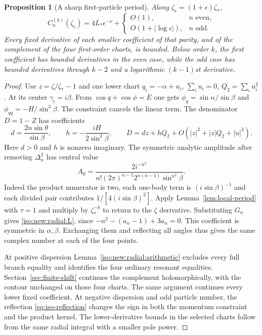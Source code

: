 \documentclass[11pt]{article}
\numberwithin{equation}{section}
\newtheorem{proposition}[theorem]{Proposition}
\theoremstyle{definition}
\begin{document}
\begin{proposition}[A sharp first-particle period]\label{iso:new:radial:first}
Along $\zeta_\epsilon=(1+\epsilon)\zeta_*$,
\[
 C_n^{(k)}(\zeta_\epsilon)=4L_*\epsilon^{-\nu}
       +\begin{cases}O(1),&n\text{ even},\\
                  O(1+|\log\epsilon|),&n\text{ odd}.
         \end{cases}
\]
Every fixed derivative of each smaller coefficient of that
parity, and of the complement of the four first-order
charts, is bounded.  Below order $k$, the first coefficient
has bounded derivatives in the even case, while the odd case
has bounded derivatives through $k-2$ and a logarithmic
$(k-1)$st derivative.
\end{proposition}
\begin{proof}
Use $z=\zeta/\zeta_*-1$ and one lower chart
$q_i=-\alpha+u_i$, $\sum_i u_i=0$, $Q_2=\sum_i u_i^2$.
At its center $\gamma_i=i\beta$. From $\cos q+\cos\phi=E$ one gets
$\phi_q=\sin\alpha/\sin\beta$ and
$\phi_{qq}=-H/\sin^3\beta$. The constraint cancels the linear term.
The denominator $D=1-Z$ has coefficients
\[
 d=\frac{2n\sin\theta}{\sin\beta},\qquad
 h=-\frac{iH}{2\sin^3\beta},\qquad D=d z+hQ_2+
            O(|z|^2+|z|Q_2+|u|^3).
\]
Here $d>0$ and $h$ is nonzero imaginary. The symmetric analytic
amplitude after removing $\Delta_n^2$ has central value
\[
 A_0=\frac{2i^{-n^2}}
 {n!(2\pi)^{n-1}2^{n(n-1)}\sin^{n^2}\beta}.
\]
Indeed the product numerator is two, each one-body term is
$(i\sin\beta)^{-1}$ and each divided pair contributes
$1/[4(i\sin\beta)^2]$. Apply Lemma~\ref{lem:local-period} with
$\tau=1$ and multiply by $\zeta_*^{-k}$ to return to the
$\zeta$ derivative. Substituting $G_n$ gives \eqref{iso:new:radial:L},
since $-n^2-(a_n-1)+3a_n=0$. This coefficient is symmetric in
$\alpha,\beta$. Exchanging them and reflecting all angles thus
gives the same complex number at each of the four points.

At positive dispersion Lemma~\ref{iso:new:radial:arithmetic}
excludes every full branch equality and identifies the four ordinary
resonant equalities. Section~\ref{sec:finite-shift} continues the
complement holomorphically, with the contour unchanged on those four
charts. The same argument continues every lower fixed coefficient.
At negative dispersion and odd particle number, the reflection
\eqref{eq:iso-reflection} changes the sign in both the momentum
constraint and the product kernel.
The lower-derivative bounds in the selected charts follow
from the same radial integral with a smaller pole power.
\end{proof}
\end{document}

